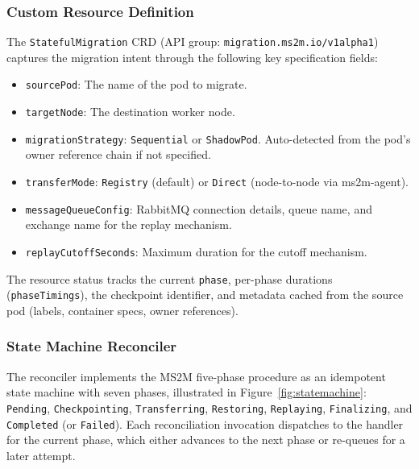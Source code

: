 \documentclass[conference]{IEEEtran}
\begin{document}
\subsubsection{Custom Resource Definition}
\label{sec:crd}

The \texttt{StatefulMigration} CRD (API group: \texttt{migration.ms2m.io/v1alpha1})
captures the migration intent through the following key specification fields:

\begin{itemize}
\item \texttt{sourcePod}: The name of the pod to migrate.
\item \texttt{targetNode}: The destination worker node.
\item \texttt{migrationStrategy}: \texttt{Sequential} or \texttt{ShadowPod}.
  Auto-detected from the pod's owner reference chain if not specified.
\item \texttt{transferMode}: \texttt{Registry} (default) or \texttt{Direct}
  (node-to-node via ms2m-agent).
\item \texttt{messageQueueConfig}: RabbitMQ connection details, queue name, and
  exchange name for the replay mechanism.
\item \texttt{replayCutoffSeconds}: Maximum duration for the cutoff mechanism.
\end{itemize}

The resource status tracks the current \texttt{phase}, per-phase durations
(\texttt{phaseTimings}), the checkpoint identifier, and metadata cached from
the source pod (labels, container specs, owner references).

\subsubsection{State Machine Reconciler}
\label{sec:statemachine}

The reconciler implements the MS2M five-phase procedure as an idempotent state
machine with seven phases, illustrated in Figure~\ref{fig:statemachine}:
\texttt{Pending}, \texttt{Checkpointing},
\texttt{Transferring}, \texttt{Restoring}, \texttt{Replaying},
\texttt{Finalizing}, and \texttt{Completed} (or \texttt{Failed}). Each
reconciliation invocation dispatches to the handler for the current phase, which
either advances to the next phase or re-queues for a later attempt.
\end{document}

